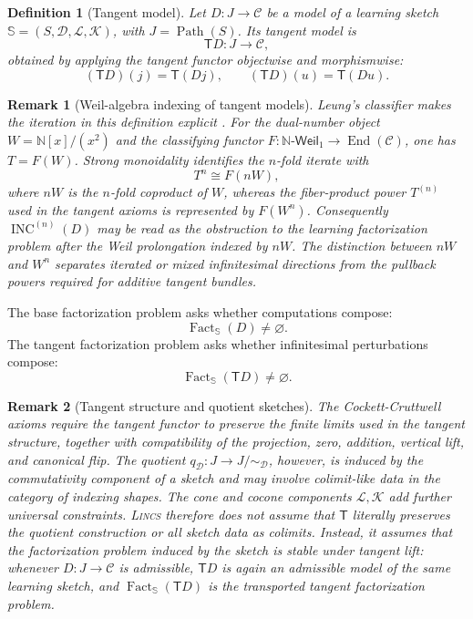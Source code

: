 \documentclass{article}
\newtheorem{definition}{Definition}
\newtheorem{remark}{Remark}
\newcommand{\C}{\mathcal{C}}
\newcommand{\T}{\mathsf{T}}
\newcommand{\Fact}{\operatorname{Fact}}
\newcommand{\Path}{\operatorname{Path}}
\begin{document}
\begin{definition}[Tangent model]
Let \(D:J\to\C\) be a model of a learning sketch \(\mathbb S=(S,\mathcal D,\mathcal L,\mathcal K)\), with \(J=\Path(S)\). Its tangent model is
\[
\T D:J\to\C,
\]
obtained by applying the tangent functor objectwise and morphismwise:
\[
(\T D)(j)=\T(Dj),
\qquad
(\T D)(u)=\T(Du).
\]
\end{definition}

\begin{remark}[Weil-algebra indexing of tangent models]
Leung's classifier makes the iteration in this definition explicit
\citep[Sec.~14]{leung2017classifying}.  For the dual-number object
$W=\mathbb N[x]/(x^2)$ and the classifying functor
$F:\mathbb N\text{-}\mathsf{Weil}_1\to\operatorname{End}(\C)$, one has
$T=F(W)$.  Strong monoidality identifies the $n$-fold iterate with
\[
T^n\cong F(nW),
\]
where $nW$ is the $n$-fold coproduct of $W$, whereas the fiber-product power
$T^{(n)}$ used in the tangent axioms is represented by $F(W^n)$.  Consequently
$\operatorname{INC}^{(n)}(D)$ may be read as the obstruction to the learning
factorization problem after the Weil prolongation indexed by $nW$.  The
distinction between $nW$ and $W^n$ separates iterated or mixed infinitesimal
directions from the pullback powers required for additive tangent bundles.
\end{remark}

The base factorization problem asks whether computations compose:
\[
\Fact_{\mathbb S}(D)\neq\varnothing.
\]
The tangent factorization problem asks whether infinitesimal perturbations compose:
\[
\Fact_{\mathbb S}(\T D)\neq\varnothing.
\]

\begin{remark}[Tangent structure and quotient sketches]
The Cockett-Cruttwell axioms require the tangent functor to preserve the finite limits used in the tangent structure, together with compatibility of the projection, zero, addition, vertical lift, and canonical flip. The quotient \(q_{\mathcal D}:J\to J/{\sim_{\mathcal D}}\), however, is induced by the commutativity component of a sketch and may involve colimit-like data in the category of indexing shapes. The cone and cocone components \(\mathcal L,\mathcal K\) add further universal constraints. \textsc{Lincs}   therefore does not assume that \(\T\) literally preserves the quotient construction or all sketch data as colimits. Instead, it assumes that the \emph{factorization problem induced by the sketch} is stable under tangent lift: whenever \(D:J\to\C\) is admissible, \(\T D\) is again an admissible model of the same learning sketch, and \(\Fact_{\mathbb S}(\T D)\) is the transported tangent factorization problem.
\end{remark}
\end{document}
